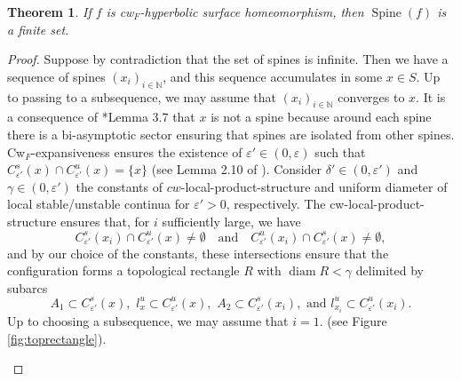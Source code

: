 \documentclass{amsart}
\theoremstyle{plain}
\newtheorem{thm}[theorem]{Theorem}
\theoremstyle{definition}
\newcommand{\spine}{\operatorname{Spine}}
\newcommand{\N}{\mathbb{N}}
\newcommand{\eps}{\varepsilon}
\newcommand{\diam}{\operatorname{diam}}
\begin{document}
\begin{thm}\label{finitespines}
    If $f$ is cw$_F$-hyperbolic surface homeomorphism, then $\spine(f)$ is a finite set.
\end{thm}

\begin{proof}
Suppose by contradiction that the set of spines is infinite. Then we have a sequence of spines $(x_i)_{i\in \N}$, and this sequence accumulates in some $x\in S$. Up to passing to a subsequence, we may assume that $(x_i)_{i\in \N}$ converges to $x$. It is a consequence of \cite{ACS}*{Lemma 3.7} that $x$ is not a spine because around each spine there is a bi-asymptotic sector ensuring that spines are isolated from other spines. Cw$_F$-expansiveness ensures the existence of $\eps' \in (0,\eps)$ such that $C^s_{\eps'}(x)\cap C^u_{\eps'}(x)=\{x\}$ (see Lemma 2.10 of \cite{ACS}). Consider $\delta'\in(0,\eps')$ and $\gamma\in(0,\eps')$ the constants of $cw$-local-product-structure and uniform diameter of local stable/unstable continua for $\eps'>0$, respectively. The cw-local-product-structure ensures that, for $i$ sufficiently large, we have
$$C^s_{\eps'}(x_i)\cap C^u_{\eps'}(x) \neq \emptyset \,\,\,\,\,\, \text{and} \,\,\,\,\,\, C^u_{\eps'}(x_i)\cap C^s_{\eps'}(x)\neq \emptyset,$$ 
and by our choice of the constants, these intersections ensure that the configuration forms a topological rectangle $R$ with $\diam R<\gamma$ delimited by subarcs 
$$A_1\subset C^s_{\eps'}(x), \,\,l_x^u\subset C^u_{\eps'}(x), \,\, A_2\subset C^s_{\eps'}(x_i), \,\, \text{and} \,\, l_{x_i}^u\subset C^u_{\eps'}(x_i).$$ 
Up to choosing a subsequence, we may assume that $i=1$. (see Figure \ref{fig:toprectangle}).
    
    \begin{figure}[H]
        \centering
        \begin{tikzpicture}[x=0.75pt,y=0.75pt,yscale=-1,xscale=1]
        

\end{tikzpicture}
\end{figure}
\end{proof}
\end{document}
